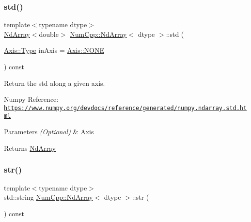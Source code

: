\subsubsection{\texorpdfstring{std()}{std()}}
{\footnotesize\ttfamily template$<$typename dtype$>$ \\
\mbox{\hyperlink{class_num_cpp_1_1_nd_array}{Nd\+Array}}$<$double$>$ \mbox{\hyperlink{class_num_cpp_1_1_nd_array}{Num\+Cpp\+::\+Nd\+Array}}$<$ dtype $>$\+::std (\begin{DoxyParamCaption}\item[{\mbox{\hyperlink{struct_num_cpp_1_1_axis_ac10eb76f8631762d9ed70c40c42ca6cb}{Axis\+::\+Type}}}]{in\+Axis = {\ttfamily \mbox{\hyperlink{struct_num_cpp_1_1_axis_ac10eb76f8631762d9ed70c40c42ca6cba747ae657022cca1d87702b56d0c038e9}{Axis\+::\+N\+O\+NE}}} }\end{DoxyParamCaption}) const\hspace{0.3cm}{\ttfamily [inline]}}

Return the std along a given axis.

Numpy Reference\+: \href{https://www.numpy.org/devdocs/reference/generated/numpy.ndarray.std.html}{\tt https\+://www.\+numpy.\+org/devdocs/reference/generated/numpy.\+ndarray.\+std.\+html}


\begin{DoxyParams}{Parameters}
{\em (\+Optional)} & \mbox{\hyperlink{struct_num_cpp_1_1_axis}{Axis}} \\
\hline
\end{DoxyParams}
\begin{DoxyReturn}{Returns}
\mbox{\hyperlink{class_num_cpp_1_1_nd_array}{Nd\+Array}} 
\end{DoxyReturn}
\mbox{\label{class_num_cpp_1_1_nd_array_ae4bf4e49cff56be827810fcfffcb21e5}} 
\subsubsection{\texorpdfstring{str()}{str()}}
{\footnotesize\ttfamily template$<$typename dtype$>$ \\
std\+::string \mbox{\hyperlink{class_num_cpp_1_1_nd_array}{Num\+Cpp\+::\+Nd\+Array}}$<$ dtype $>$\+::str (\begin{DoxyParamCaption}{ }\end{DoxyParamCaption}) const\hspace{0.3cm}{\ttfamily [inline]}}

